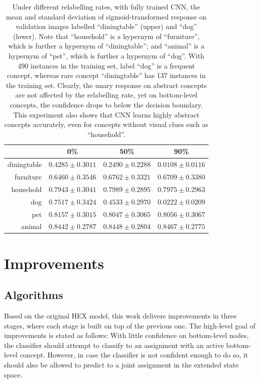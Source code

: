 \documentclass[11pt,a4paper]{book}
\begin{document}
\begin{table}[htbp]
\centering
\begin{tabular}{r|c|c|c}
 & 0\% & 50\% & 90\%\\
\hline
diningtable & $0.4285\pm0.3011$ & $0.2490\pm0.2288$ & $0.0108\pm0.0116$\\
furniture   & $0.6460\pm0.3546$ & $0.6762\pm0.3321$ & $0.6709\pm0.3380$\\
household   & $0.7943\pm0.3041$ & $0.7989\pm0.2895$ & $0.7975\pm0.2963$\\
\hline
dog         & $0.7517\pm0.3424$ & $0.4533\pm0.2970$ & $0.0222\pm0.0209$\\
pet         & $0.8157\pm0.3015$ & $0.8047\pm0.3065$ & $0.8056\pm0.3067$\\
animal      & $0.8442\pm0.2787$ & $0.8448\pm0.2804$ & $0.8467\pm0.2775$
\end{tabular}
\caption{Under different relabelling rates, with fully trained CNN, the mean and standard deviation of sigmoid-transformed response on validation images labelled ``diningtable'' (upper) and ``dog'' (lower). Note that ``household'' is a hypernym of ``furniture'', which is further a hypernym of ``diningtable''; and ``animal'' is a hypernym of ``pet'', which is further a hypernym of ``dog''. With 490 instances in the training set, label ``dog'' is a frequent concept, whereas rare concept ``diningtable'' has 137 instances in the training set. Clearly, the unary response on abstract concepts are not affected by the relabelling rate, yet on bottom-level concepts, the confidence drops to below the decision boundary.  This experiment also shows that CNN learns highly abstract concepts accurately, even for concepts without visual clues such as ``household''.}
\label{tab:resp}
\end{table}

\chapter{Improvements}
\label{chap:improvement}
\section{Algorithms}

Based on the original HEX model, this work delivers improvements in three stages, where each stage is built on top of the previous one. The high-level goal of improvements is stated as follows: With little confidence on bottom-level nodes, the classifier should attempt to classify to an assignment with an active bottom-level concept. However, in case the classifier is not confident enough to do so, it should also be allowed to predict to a joint assignment in the extended state space.
\end{document}
